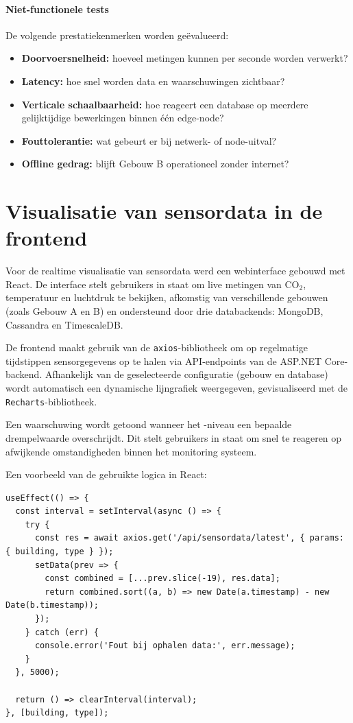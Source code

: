 \paragraph{Niet-functionele tests}
De volgende prestatiekenmerken worden geëvalueerd:
\begin{itemize}
    \item \textbf{Doorvoersnelheid:} hoeveel metingen kunnen per seconde worden verwerkt?
    \item \textbf{Latency:} hoe snel worden data en waarschuwingen zichtbaar?
    \item \textbf{Verticale schaalbaarheid:} hoe reageert een database op meerdere gelijktijdige bewerkingen binnen één edge-node?
    \item \textbf{Fouttolerantie:} wat gebeurt er bij netwerk- of node-uitval?
    \item \textbf{Offline gedrag:} blijft Gebouw B operationeel zonder internet?
\end{itemize}

\section{Visualisatie van sensordata in de frontend}

Voor de realtime visualisatie van sensordata werd een webinterface gebouwd met React.
 De interface stelt gebruikers in staat om live metingen van CO$_2$, temperatuur en luchtdruk te bekijken, afkomstig van verschillende gebouwen (zoals Gebouw A en B) en ondersteund door drie databackends: MongoDB, Cassandra en TimescaleDB.

De frontend maakt gebruik van de \texttt{axios}-bibliotheek om op regelmatige tijdstippen sensorgegevens op te halen via API-endpoints van de ASP.NET Core-backend.
 Afhankelijk van de geselecteerde configuratie (gebouw en database) wordt automatisch een dynamische lijngrafiek weergegeven, gevisualiseerd met de \texttt{Recharts}-bibliotheek.

Een waarschuwing wordt getoond wanneer het -niveau een bepaalde drempelwaarde overschrijdt. Dit stelt gebruikers in staat om snel te reageren op afwijkende omstandigheden binnen het monitoring systeem.

Een voorbeeld van de gebruikte logica in React:

\begin{verbatim}
useEffect(() => {
  const interval = setInterval(async () => {
    try {
      const res = await axios.get('/api/sensordata/latest', { params: { building, type } });
      setData(prev => {
        const combined = [...prev.slice(-19), res.data];
        return combined.sort((a, b) => new Date(a.timestamp) - new Date(b.timestamp));
      });
    } catch (err) {
      console.error('Fout bij ophalen data:', err.message);
    }
  }, 5000);

  return () => clearInterval(interval);
}, [building, type]);
\end{verbatim}

